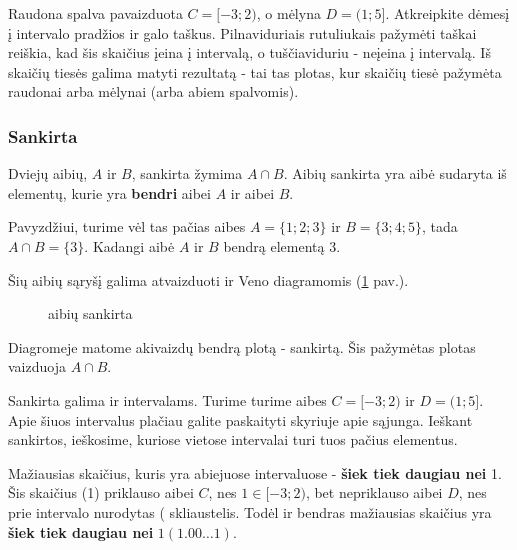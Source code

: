 \documentclass[a4paper]{article}
\newcommand{\germanqq}[1]{{\selectlanguage{german}\glqq#1\grqq\selectlanguage{english}}}
\def\firstcircle{(0,0) circle (1.5cm)}
\def\secondcircle{(0:2cm) circle (1.5cm)}
\begin{document}
Raudona spalva pavaizduota $C=[-3;2)$, o mėlyna $D =(1;5]$. Atkreipkite dėmesį
į intervalo pradžios ir galo taškus. Pilnaviduriais rutuliukais pažymėti taškai
reiškia, kad šis skaičius įeina į intervalą, o tuščiaviduriu - neįeina į
intervalą. Iš skaičių tiesės galima matyti rezultatą - tai tas plotas, kur
skaičių tiesė
pažymėta raudonai arba mėlynai (arba abiem spalvomis).

\subsubsection{Sankirta}

Dviejų aibių, $A$ ir $B$, sankirta žymima $A \cap B$. Aibių sankirta yra
aibė sudaryta iš elementų, kurie yra \textbf{bendri} aibei $A$ ir aibei $B$.

Pavyzdžiui, turime vėl tas pačias aibes $A=\{1;2;3\}$ ir  $B=\{3;4;5\}$, tada
$A \cap B = \{3\}$. Kadangi aibė $A$ ir $B$ bendrą elementą 3.

Šių aibių sąryšį galima atvaizduoti ir Veno diagramomis
(\ref{fig:set_intersection} pav.).

\begin{figure}[!htbp]
      \centering
      \caption{aibių sankirta} \label{fig:set_intersection}
\end{figure}

Diagromeje matome akivaizdų bendrą plotą - sankirtą. Šis pažymėtas plotas
vaizduoja $A \cap B$.

Sankirta galima ir intervalams. Turime turime aibes $C=[-3;2)$ ir $D=(1;5]$.
Apie šiuos intervalus plačiau galite paskaityti skyriuje apie sąjunga. Ieškant
sankirtos, ieškosime, kuriose vietose intervalai turi tuos pačius elementus.

Mažiausias skaičius, kuris yra abiejuose intervaluose - \textbf{šiek tiek
      daugiau nei} 1. Šis skaičius (1) priklauso aibei $C$, nes $1 \in [-3;2)$,
bet nepriklauso aibei $D$, nes prie intervalo nurodytas \germanqq{(}
skliaustelis. Todėl ir bendras mažiausias skaičius yra \textbf{šiek tiek
      daugiau nei} $1 (1.00\ldots1)$.
\end{document}
